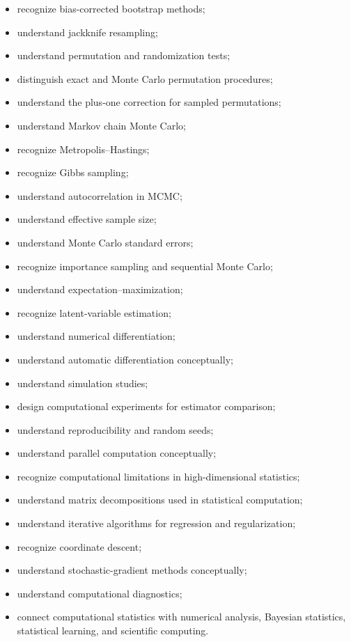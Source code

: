 {\begin{itemize}
    \item recognize bias-corrected bootstrap methods;
    \item understand jackknife resampling;
    \item understand permutation and randomization tests;
    \item distinguish exact and Monte Carlo permutation procedures;
    \item understand the plus-one correction for sampled permutations;
    \item understand Markov chain Monte Carlo;
    \item recognize Metropolis--Hastings;
    \item recognize Gibbs sampling;
    \item understand autocorrelation in MCMC;
    \item understand effective sample size;
    \item understand Monte Carlo standard errors;
    \item recognize importance sampling and sequential Monte Carlo;
    \item understand expectation--maximization;
    \item recognize latent-variable estimation;
    \item understand numerical differentiation;
    \item understand automatic differentiation conceptually;
    \item understand simulation studies;
    \item design computational experiments for estimator comparison;
    \item understand reproducibility and random seeds;
    \item understand parallel computation conceptually;
    \item recognize computational limitations in high-dimensional
          statistics;
    \item understand matrix decompositions used in statistical
          computation;
    \item understand iterative algorithms for regression and
          regularization;
    \item recognize coordinate descent;
    \item understand stochastic-gradient methods conceptually;
    \item understand computational diagnostics;
    \item connect computational statistics with numerical analysis,
          Bayesian statistics, statistical learning, and scientific
          computing.
\end{itemize}
}

